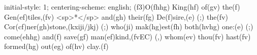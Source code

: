 initial-style: 1;
centering-scheme: english;
(f3)O(fhhg) King(hf) of(gv) the(f) Gen(ef)tiles,(fv) <sp>*</sp> and(gh) their(fg) De(f)sire,(e) (;) the(fv) Cor(cf)ner(gh)stone,(kxiji/jkj) (;) who(ji) mak(hg)est(fh) both(hvhg) one:(e) (;) come(ehhg) and(f) save(gf) man(ef)kind,(fvEC) (,) whom(ev) thou(fv) hast(fv) formed(hg) out(eg) of(hv) clay.(f)

